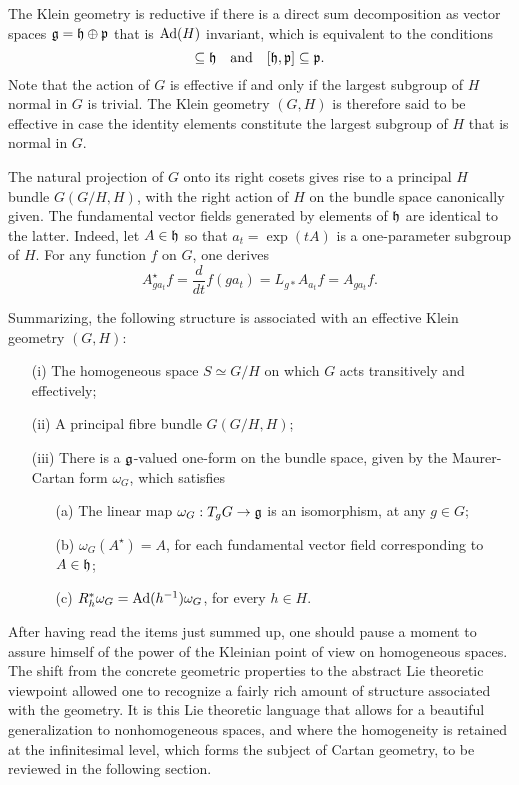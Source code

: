 \documentclass[
final,
11pt,
a4paper,
DIV=11,
headinclude=true,
footinclude=false,
bibliography=totoc,
twoside=true,  %
BCOR=5mm
]{scrbook}
\begin{document}
The Klein geometry is reductive if there is a direct sum 
decomposition as vector spaces $\mathfrak{g} = \mathfrak{h} \oplus \mathfrak{p}$ 
that is $\operatorname{Ad}(H)$ invariant, which is equivalent to the conditions 
\begin{equation*}
  [\mf{h},\mf{h}] \subseteq \mf{h}
  \quad\text{and}\quad
  [\mf{h},\mf{p}] \subseteq \mf{p}.
\end{equation*}
Note that the action of $G$ is effective if and only if the 
largest subgroup of $H$ normal in $G$ is trivial. The Klein 
geometry $(G,H)$ is therefore said to be effective in case the 
identity elements constitute the largest subgroup of $H$ that is 
normal in $G$.

The natural projection of $G$ onto its right cosets gives rise to 
a principal $H$ bundle $G(G/H,H)$, with the right action of $H$ 
on the bundle space canonically given. The fundamental vector 
fields generated by elements of $\mathfrak{h}$ are identical to the 
latter. Indeed, let $A \in \mathfrak{h}$ so that $a_t = \exp(tA)$ is 
a one-parameter subgroup of $H$. For any function $f$ on $G$, one 
derives
\begin{equation*}
  A^\star_{ga_t}f = \frac{d}{dt}f(ga_t) = L_{g*}A_{a_t} f = 
  A_{ga_t}f.
\end{equation*}

Summarizing, the following structure is associated with an 
effective Klein geometry $(G,H)$:
\begin{itemize}
  \item[(i)] The homogeneous space $S \simeq G/H$ on which $G$ 
    acts transitively and effectively;
  \item[(ii)] A principal fibre bundle $G(G/H,H)$;
  \item[(iii)] There is a $\mathfrak{g}$-valued one-form on the bundle 
    space, given by the Maurer-Cartan form $\omega_G$, which 
    satisfies
    \begin{itemize}
      \item[(a)] The linear map $\omega_G : T_g G \to \mathfrak{g}$ is 
        an isomorphism, at any $g \in G$;
      \item[(b)] $\omega_G(A^\star) = A$, for each fundamental 
        vector field corresponding to $A \in \mathfrak{h}$;
      \item[(c)] $R^*_h\omega_G = \operatorname{Ad}(h^{-1})\omega_G$, for every 
        $h \in H$.
    \end{itemize}
\end{itemize}

After having read the items just summed up, one should pause 
a moment to assure himself of the power of the Kleinian point of 
view on homogeneous spaces.  The shift from the concrete 
geometric properties to the abstract Lie theoretic viewpoint 
allowed one to recognize a fairly rich amount of structure 
associated with the geometry.  It is this Lie theoretic language 
that allows for a beautiful generalization to nonhomogeneous 
spaces, and where the homogeneity is retained at the 
infinitesimal level, which forms the subject of Cartan geometry, 
to be reviewed in the following section. 
\end{document}
